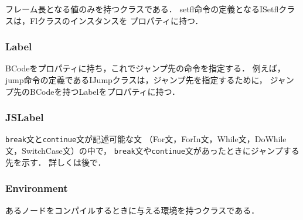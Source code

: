 \documentclass[a4j,12pt]{jarticle}
\begin{document}
フレーム長となる値のみを持つクラスである．
setfl命令の定義となるISetflクラスは，Flクラスのインスタンスを
プロパティに持つ．

\subsubsection{Label}

BCodeをプロパティに持ち，これでジャンプ先の命令を指定する．
例えば，jump命令の定義であるIJumpクラスは，ジャンプ先を指定するために，
ジャンプ先のBCodeを持つLabelをプロパティに持つ．

\subsubsection{JSLabel}

\texttt{break}文と\texttt{continue}文が記述可能な文
（For文，ForIn文，While文，DoWhile文，SwitchCase文）の中で，
\texttt{break}文や\texttt{continue}文があったときにジャンプする
先を示す．
詳しくは後で．

\subsubsection{Environment}

あるノードをコンパイルするときに与える環境を持つクラスである．







\end{document}
